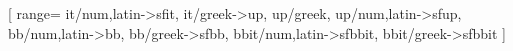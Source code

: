 \RequirePackage{amsmath,amsthm,mathtools}

	\DeclareMathOperator{\sen}{sen}
	\DeclareMathOperator{\tg}{tg}
	\DeclareMathOperator{\cotg}{cotg}
	\DeclareMathOperator{\cosec}{cosec}
	\DeclareMathOperator{\arcsen}{arcsen}
	\DeclareMathOperator{\arctg}{arctg}
	\DeclareMathOperator{\senh}{senh}
	\DeclareMathOperator{\tgh}{tgh}
	\DeclareMathOperator{\mdc}{mdc}
	\DeclareMathOperator{\mmc}{mmc}
	\DeclareMathOperator{\med}{med}
	\DeclareMathOperator{\rad}{rad}
	\DeclareMathOperator{\dirac}{\delta}
	\DeclareMathOperator{\mmu}{\mu}
	\renewcommand{\Im}{\operatorname{Im}}
	\DeclareMathOperator{\D}{D}
	\DeclareMathOperator{\CD}{CD}
	\DeclareMathOperator{\area}{\text{Area}\,}
	\newcommand{\R}{\mathbb{R}}
	\newcommand{\Q}{\mathbb{Q}}
	\newcommand{\Z}{\mathbb{Z}}
	\newcommand{\N}{\mathbb{N}}


\iffonts
\RequirePackage{unicode-math}

[
    range={
        it/{num,latin}->sfit,
        it/{greek}->up,
        up/{greek},
        up/{num,latin}->sfup,
        bb/{num,latin}->bb,
        bb/{greek}->sfbb,
        bbit/{num,latin}->sfbbit,
        bbit/{greek}->sfbbit
    }
]
\else
\RequirePackage{amssymb}
\fi

